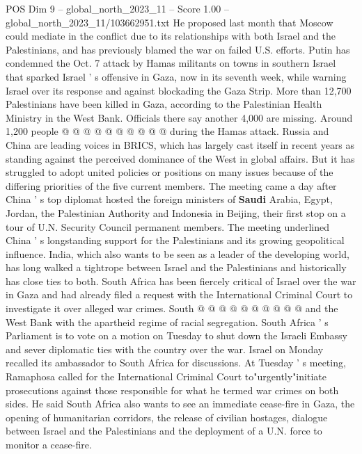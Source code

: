 \begin{textsample}{POS Dim 9 – global\_north\_2023\_11 – Score 1.00 – global\_north\_2023\_11/103662951.txt}
He proposed last month that Moscow could mediate in the conflict due to its relationships with both Israel and the Palestinians, and has previously blamed the war on failed U.S. efforts.
Putin has condemned the Oct. 7 attack by Hamas militants on towns in southern Israel that sparked Israel ' s offensive in Gaza, now in its seventh week, while warning Israel over its response and against blockading the Gaza Strip.
More than 12,700 Palestinians have been killed in Gaza, according to the Palestinian Health Ministry in the West Bank.
Officials there say another 4,000 are missing.
Around 1,200 people @ @ @ @ @ @ @ @ @ @ during the Hamas attack.
Russia and China are leading voices in BRICS, which has largely cast itself in recent years as standing against the perceived dominance of the West in global affairs.
But it has struggled to adopt united policies or positions on many issues because of the differing priorities of the five current members.
The meeting came a day after China ' s top diplomat hosted the foreign ministers of \textbf{Saudi} Arabia, Egypt, Jordan, the Palestinian Authority and Indonesia in Beijing, their first stop on a tour of U.N.
Security Council permanent members.
The meeting underlined China ' s longstanding support for the Palestinians and its growing geopolitical influence.
India, which also wants to be seen as a leader of the developing world, has long walked a tightrope between Israel and the Palestinians and historically has close ties to both.
South Africa has been fiercely critical of Israel over the war in Gaza and had already filed a request with the International Criminal Court to investigate it over alleged war crimes.
South @ @ @ @ @ @ @ @ @ @ and the West Bank with the apartheid regime of racial segregation.
South Africa ' s Parliament is to vote on a motion on Tuesday to shut down the Israeli Embassy and sever diplomatic ties with the country over the war.
Israel on Monday recalled its ambassador to South Africa for discussions.
At Tuesday ' s meeting, Ramaphosa called for the International Criminal Court to"urgently"initiate prosecutions against those responsible for what he termed war crimes on both sides.
He said South Africa also wants to see an immediate cease-fire in Gaza, the opening of humanitarian corridors, the release of civilian hostages, dialogue between Israel and the Palestinians and the deployment of a U.N. force to monitor a cease-fire.

\end{textsample}
